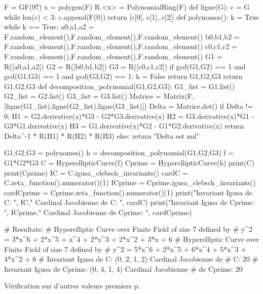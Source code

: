 \documentclass[12pt,a4paper]{article}
\begin{document}
	\begin{sageblock}
	F = GF(97)
	x = polygen(F)
	R.<x> = PolynomialRing(F)
	def ligne(G):
			c = G
			while len(c) < 3:
			c.append(F(0))
			return [c[0], c[1], c[2]]
	def polynomes():
			k = True
			while k == True:
					a0,a1,a2 = F.random_element(),F.random_element(),F.random_element()
					b0,b1,b2 = F.random_element(),F.random_element(),F.random_element()
					c0,c1,c2 = F.random_element(),F.random_element(),F.random_element()
					G1 = R([a0,a1,a2])
					G2 = R([b0,b1,b2])
					G3 = R([c0,c1,c2])
					if gcd(G1,G2) == 1 and gcd(G1,G3) == 1 and gcd(G3,G2) ==  1:
							k = False
							return G1,G2,G3
			return G1,G2,G3
	def decomposition_polynomial(G1,G2,G3):
			G1_list = G1.list()
			G2_list = G2.list()
			G3_list = G3.list()
			Matrice = Matrix(F,[ligne(G1_list),ligne(G2_list),ligne(G3_list)])
			Delta = Matrice.det()
			if Delta != 0:
					H1 = G2.derivative(x)*G3 - G2*G3.derivative(x)
					H2 = G3.derivative(x)*G1 - G3*G1.derivative(x)
					H3 = G1.derivative(x)*G2 - G1*G2.derivative(x)
					return Delta^-1 * R(H1) * R(H2) * R(H3)
			else: return "Delta est nul"
		
	G1,G2,G3 = polynomes()
	h = decomposition_polynomial(G1,G2,G3)
	f = G1*G2*G3
	C = HyperellipticCurve(f)
	Cprime = HyperellipticCurve(h)
	print(C)
	print(Cprime)
	IC  = C.igusa_clebsch_invariants()
	cardC  = C.zeta_function().numerator()(1)
	ICprime = Cprime.igusa_clebsch_invariants()        
	cardCprime  = Cprime.zeta_function().numerator()(1)
	print("Invariant Igusa de C: ", IC," Cardinal Jacobienne de C: ", 
	cardC)
	print("Invariant Igusa de Cprime: ", ICprime," Cardinal Jacobienne 
	de Cprime: ", cardCprime) 
	
	# Resultats:
	# Hyperelliptic Curve over Finite Field of size 7 defined by 
	# y^2 = 3*x^6 + 2*x^5 + x^4 + 2*x^3 + 2*x^2 + 3*x + 6
	# Hyperelliptic Curve over Finite Field of size 7 defined by 
	# y^2 = 5*x^6 + 2*x^5 + 6*x^4 + 5*x^3 + 4*x^2 + 6
	# Invariant Igusa de C:  (0, 2, 1, 2)  Cardinal Jacobienne de
	# C:  20
	# Invariant Igusa de Cprime:  (0, 4, 1, 4)  Cardinal Jacobienne
	# de Cprime:  20
	
	\end{sageblock}
	Vérification sur d'autres valeurs premiers p.
\end{document}
